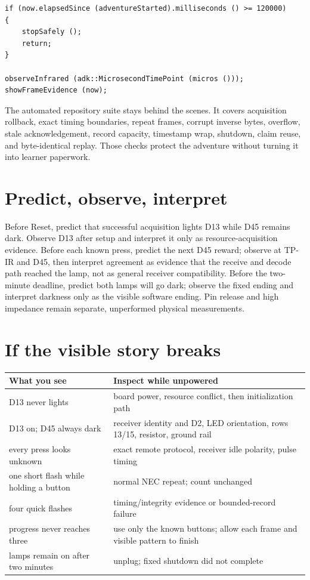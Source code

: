 \documentclass[11pt]{article}
\begin{document}
\begin{lstlisting}[style=adkcpp]
if (now.elapsedSince (adventureStarted).milliseconds () >= 120000)
{
    stopSafely ();
    return;
}

observeInfrared (adk::MicrosecondTimePoint (micros ()));
showFrameEvidence (now);
\end{lstlisting}

The automated repository suite stays behind the scenes. It covers acquisition
rollback, exact timing boundaries, repeat frames, corrupt inverse bytes,
overflow, stale acknowledgement, record capacity, timestamp wrap, shutdown,
claim reuse, and byte-identical replay. Those checks protect the adventure
without turning it into learner paperwork.

\section{Predict, observe, interpret}

Before Reset, predict that successful acquisition lights D13 while D45 remains
dark. Observe D13 after setup and interpret it only as resource-acquisition
evidence. Before each known press, predict the next D45 reward; observe at
TP-IR and D45, then interpret agreement as evidence that the receive and decode
path reached the lamp, not as general receiver compatibility. Before the
two-minute deadline, predict both lamps will go dark; observe the fixed ending
and interpret darkness only as the visible software ending. Pin release and
high impedance remain separate, unperformed physical measurements.

\section{If the visible story breaks}

\begin{tabularx}{\linewidth}{@{}l X@{}}
\toprule
What you see & Inspect while unpowered\\\midrule
D13 never lights & board power, resource conflict, then initialization path\\
D13 on; D45 always dark & receiver identity and D2, LED orientation, rows 13/15,
  resistor, ground rail\\
every press looks unknown & exact remote protocol, receiver idle polarity,
  pulse timing\\
one short flash while holding a button & normal NEC repeat; count unchanged\\
four quick flashes & timing/integrity evidence or bounded-record failure\\
progress never reaches three & use only the known buttons; allow each frame
  and visible pattern to finish\\
lamps remain on after two minutes & unplug; fixed shutdown did not complete\\
\bottomrule
\end{tabularx}
\end{document}
